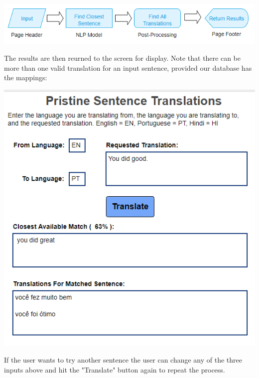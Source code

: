 \documentclass[runningheads]{llncs}
\begin{document}
	\begin{minipage}{\linewidth}
		\begin{center}
			\includegraphics[width=\linewidth]{Process_Map.png}
			\label{fig:Process Map}
			\vspace*{1cm}
		\end{center}
	\end{minipage}
	\afterpage{\clearpage}
The results are then reurned to the screen for display. Note that there can be more than one valid translation for an input sentence, provided our database has the mappings:

	\begin{minipage}{\linewidth}
		\begin{center}
			\includegraphics[width=\linewidth]{Screen.png}
			\label{fig:Display Translations}
			\vspace*{1cm}
		\end{center}
	\end{minipage}
	\afterpage{\clearpage}
If the user wants to try another sentence the user can change any of the three inputs above and hit the "Translate" button again to repeat the process.
\end{document}
